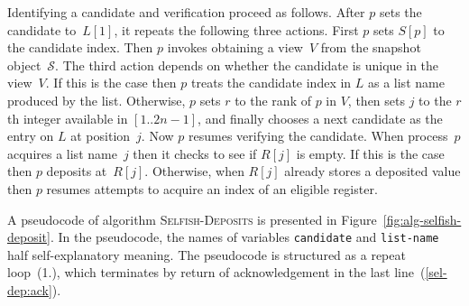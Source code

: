 \documentclass[11pt]{article}
\newcommand{\cS}{\mathcal{S}}
\begin{document}
Identifying a candidate and verification proceed as follows. 
After $p$ sets the candidate to~$L[1]$, it  repeats the following three actions.
First $p$ sets $S[p]$ to the candidate index.
Then $p$ invokes obtaining a view~$V$ from the snapshot object~$\cS$.
The  third action depends on whether the candidate is unique in the view~$V$.
If this is the case then $p$ treats the candidate index in $L$ as a list name produced by the list.
Otherwise, $p$ sets $r$ to the rank of $p$ in $V$, then sets $j$ to the $r$th integer available in $[1..2n-1]$, and finally chooses a next candidate as the entry on $L$ at position~$j$.
Now $p$ resumes verifying the candidate.
When process~$p$ acquires a list name~$j$ then it checks to see if $R[j]$ is empty.
If this is the case then $p$ deposits at~$R[j]$.
Otherwise, when $R[j]$ already stores a deposited value then $p$ resumes attempts to acquire an index of an eligible register. 

A pseudocode of algorithm \textsc{Selfish-Deposits} is presented in Figure~\ref{fig:alg-selfish-deposit}.
In the pseudocode, the names of variables \texttt{candidate} and \texttt{list-name} half self-explanatory meaning.
The pseudocode is structured as a repeat loop~(1.), which terminates by return of acknowledgement in the last line~(\ref{sel-dep:ack}).
\end{document}
